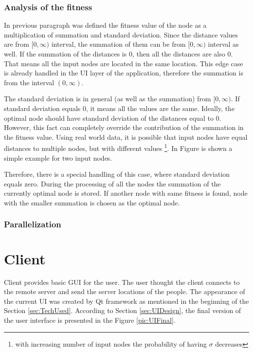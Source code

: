 \documentclass[thesis=M,english]{FITthesis}[2012/10/20]
\begin{document}
\subsubsection{Analysis of the fitness}
In previous paragraph was defined the fitness value of the node as a multiplication of summation and standard deviation. Since the distance values are from $[0, \infty)$ interval, the summation of them can be from $[0, \infty)$ interval as well. If the summation of the distances is $0$, then all the distances are also $0$. That means all the input nodes are located in the same location. This edge case is already handled in the UI layer of the application, therefore the summation is from the interval $(0, \infty)$.

The standard deviation is in general (as well as the summation) from $[0, \infty)$. If standard deviation equals $0$, it means all the values are the same. Ideally, the optimal node should have standard deviation of the distances equal to $0$. However, this fact can completely override the contribution of the summation in the fitness value. Using real world data, it is possible that input nodes have equal distances to multiple nodes, but with different values \footnote{with increasing number of input nodes the probability of having $\sigma$ decreases}. In Figure is shown a simple example for two input nodes.

Therefore, there is a special handling of this case, where standard deviation equals zero. During the processing of all the nodes the summation of the currently optimal node is stored. If another node with same fitness is found, node with the smaller summation is chosen as the optimal node.


\subsubsection{Parallelization}
\label{sec:real_parallelization}

\section{Client}
\label{sec:RClient}
Client provides basic GUI for the user. The user thought the client connects to the remote server and send the server locations of the people.
The appearance of the current UI was created by Qt framework as mentioned in the beginning of the Section \ref{sec:TechUsed}. According to Section \ref{sec:UIDesign}, the final version of the user interface is presented in the Figure \ref{pic:UIFinal}.
\end{document}
